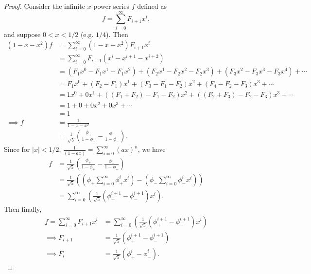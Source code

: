 \documentclass{article}
\begin{document}
\begin{proof}
Consider the infinite $x$-power series $f$ defined as
\[
  f = \sum_{i=0}^\infty F_{i+1} x^i,
\]
and suppose $0 < x < 1/2$ (e.g. $1/4$).
Then
\begin{align*}
  (1 - x - x^2) f
&=
  \sum_{i=0}^\infty (1 - x - x^2) F_{i+1} x^i
\\&=
  \sum_{i=0}^\infty F_{i+1} (x^i - x^{i+1} - x^{i+2})
\\&=
  (F_1 x^0 - F_1 x^1 - F_1 x^2) +
  (F_2 x^1 - F_2 x^2 - F_2 x^3) +
  (F_3 x^2 - F_3 x^3 - F_3 x^4) + \cdots
\\&=
  F_1 x^0 +
  (F_2 - F_1) x^1 +
  (F_3 - F_1 - F_2) x^2 +
  (F_4 - F_2 - F_3) x^3 +
  \cdots
\\&=
  1 x^0 +
  0 x^1 +
  ((F_1 + F_2) - F_1 - F_2) x^2 +
  ((F_2 + F_3) - F_2 - F_3) x^3 +
  \cdots
\\&=
  1 +
  0 +
  0 x^2 +
  0 x^3 +
  \cdots
\\&=
  1
\\\implies
  f
&=
  \frac{1}{1 - x - x^2}
\\&=
  \frac{1}{\sqrt{5}} \left(
    \frac{\phi_+}{1 - \phi_+} -
    \frac{\phi_-}{1 - \phi_-}
  \right).
\end{align*}
Since for $|x| < 1/2$, $\frac{1}{(1 - a x)} = \sum_{i=0}^\infty (a x)^n$,
we have
\begin{align*}
  f
&=
  \frac{1}{\sqrt{5}} \left(
    \frac{\phi_+}{1 - \phi_+} -
    \frac{\phi_-}{1 - \phi_-}
  \right)
\\&=
  \frac{1}{\sqrt{5}} \left(
    \left(\phi_+ \sum_{i=0}^\infty \phi_+^i x^i\right) -
    \left(\phi_-\sum_{i=0}^\infty \phi_-^i x^i\right)
  \right)
\\&=
  \sum_{i=0}^\infty \left(
    \frac{1}{\sqrt{5}} \left(\phi_+^{i+1} - \phi_-^{i+1}\right) x^i
  \right).
\end{align*}
Then finally,
\begin{align*}
  f
=
  \sum_{i=0}^\infty F_{i+1} x^i
&=
  \sum_{i=0}^\infty \left(
    \frac{1}{\sqrt{5}} \left(\phi_+^{i+1} - \phi_-^{i+1}\right) x^i
  \right)
\\\implies
  F_{i+1}
&=
  \frac{1}{\sqrt{5}} \left(\phi_+^{i+1} - \phi_-^{i+1}\right)
\\\implies
  F_i
&=
  \frac{1}{\sqrt{5}} \left(\phi_+^i - \phi_-^i\right).
\end{align*}
\end{proof}
\end{document}
